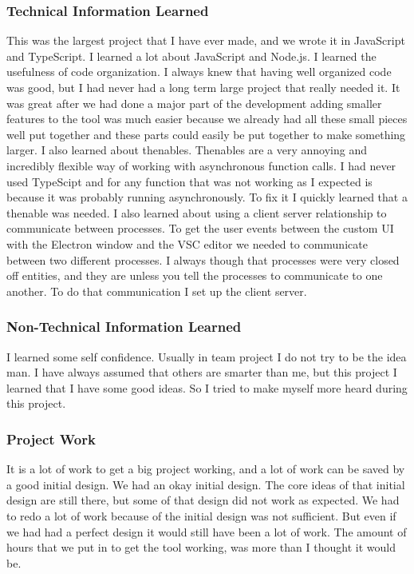 \documentclass[letterpaper,10pt,titlepage,draftclsnofoot,onecolumn,onesided] {IEEEtran}
\begin{document}
\subsubsection{Technical Information Learned}

This was the largest project that I have ever made, and we wrote it in JavaScript and TypeScript. 
I learned a lot about JavaScript and Node.js.
I learned the usefulness of code organization. 
I always knew that having well organized code was good, but I had never had a long term large project that really needed it.
It was great after we had done a major part of the development adding smaller features to the tool was much easier because we already had all these small pieces well put together and these parts could easily be put together to make something larger.
I also learned about thenables. 
Thenables are a very annoying and incredibly flexible way of working with asynchronous function calls.
I had never used TypeScipt and for any function that was not working as I expected is because it was probably running asynchronously. 
To fix it I quickly learned that a thenable was needed.
I also learned about using a client server relationship to communicate between processes.
To get the user events between the custom UI with the Electron window and the VSC editor we needed to communicate between two different processes. 
I always though that processes were very closed off entities, and they are unless you tell the processes to communicate to one another. 
To do that communication I set up the client server.

\subsubsection{Non-Technical Information Learned}

I learned some self confidence.
Usually in team project I do not try to be the idea man. 
I have always assumed that others are smarter than me, but this project I learned that I have some good ideas.
So I tried to make myself more heard during this project.

\subsubsection{Project Work}

It is a lot of work to get a big project working, and a lot of work can be saved by a good initial design.
We had an okay initial design. 
The core ideas of that initial design are still there, but some of that design did not work as expected. 
We had to redo a lot of work because of the initial design was not sufficient.
But even if we had had a perfect design it would still have been a lot of work. 
The amount of hours that we put in to get the tool working, was more than I thought it would be. 
\end{document}

